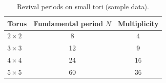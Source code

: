 \begin{table}[htbp]
  \centering
  \caption{Revival periods on small tori (sample data).}
  \label{tab:revival-periods}
  \begin{tabular}{lcc}
    \toprule
    Torus & Fundamental period $N$ & Multiplicity \\
    \midrule
    $2 \times 2$ & 8  & 4  \\
    $3 \times 3$ & 12 & 9  \\
    $4 \times 4$ & 24 & 16 \\
    $5 \times 5$ & 60 & 36 \\
    \bottomrule
  \end{tabular}
\end{table}
